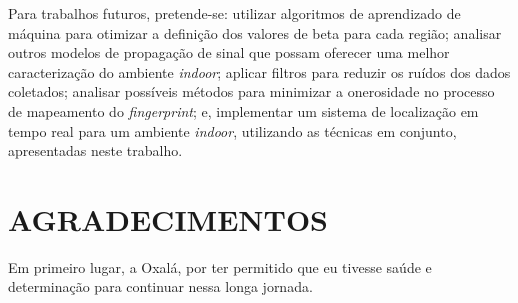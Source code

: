 \documentclass[12pt]{artigoifce}
\begin{document}
Para trabalhos futuros, pretende-se: utilizar algoritmos de aprendizado de máquina para otimizar a definição dos valores de beta para cada região; analisar outros modelos de propagação de sinal que possam oferecer uma melhor caracterização do ambiente \textit{indoor}; aplicar filtros para reduzir os ruídos dos dados coletados; analisar possíveis métodos para minimizar a onerosidade no processo de mapeamento do \textit{fingerprint}; e, implementar um sistema de localização em tempo real para um ambiente \textit{indoor}, utilizando as técnicas em conjunto, apresentadas neste trabalho.

\vspace{\onelineskip}



    


\section{AGRADECIMENTOS}
\label{agradecimentos}

Em primeiro lugar, a Oxalá, por ter permitido que eu tivesse saúde e determinação para continuar nessa longa jornada. 
\end{document}
